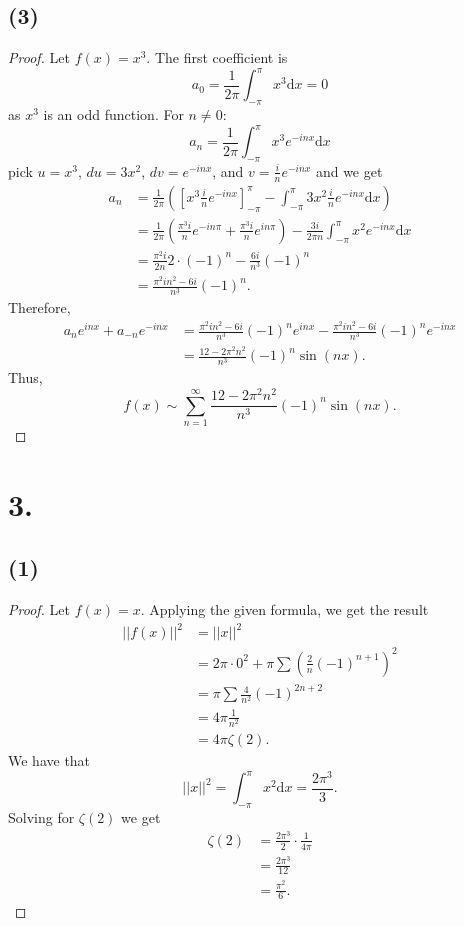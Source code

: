 \documentclass{article}
\begin{document}
\subsection*{(3)}
\begin{proof}
  Let $f(x) =x^3$. The first coefficient is
  \[
  a_0 = \frac{1}{2 \pi } \int_{-\pi}^{\pi}x^3 \mathrm{d}x = 0  
  \]
  as $x^3$ is an odd function. For $n \neq 0$:
  \[
  a_n = \frac{1}{2 \pi}\int_{-\pi}^{\pi}x^3e^{-inx}\mathrm{d}x  
  \]
  pick $u = x^3$, $du = 3x^2$, $dv = e^{-inx}$, and $v = \frac{i}{n}e^{-inx}$ and we get
  \begin{align*}
    a_n &= \frac{1}{2 \pi}\left(\left[x^3\frac{i}{n}e^{-inx} \right]_{-\pi}^{\pi} - \int_{-\pi}^{\pi}3x^2 \frac{i}{n}e^{-inx}\mathrm{d}x \right) \\
    &= \frac{1}{2 \pi}\left(\frac{\pi^3 i}{n}e^{-in \pi} + \frac{\pi^3 i}{n}e^{in \pi} \right) - \frac{3i}{2 \pi n}\int_{-\pi}^{\pi}x^2e^{-inx}\mathrm{d}x \\
    &= \frac{\pi^2i}{2n}2 \cdot (-1)^n - \frac{6 i}{n^3}(-1)^n \\
    &= \frac{\pi^2 in^2 - 6i}{n^3}(-1)^n.
  \end{align*}
  Therefore, 
  \begin{align*}
    a_ne^{inx} + a_{-n}e^{-inx} &= \frac{\pi^2 in^2 - 6i}{n^3}(-1)^ne^{inx} -\frac{\pi^2 in^2 - 6i}{n^3}(-1)^ne^{-inx} \\
    &= \frac{12 - 2 \pi^2 n^2}{n^3}(-1)^n \sin(nx).
  \end{align*}
  Thus, 
  \[
  f(x) \sim \sum\limits_{n = 1}^{\infty}\frac{12 - 2 \pi^2 n^2}{n^3}(-1)^n \sin(nx).  
  \]
\end{proof}
\section*{3.}
\subsection*{(1)}
\begin{proof}
Let $f(x) = x$. Applying the given formula, we get the result
\begin{align*}
  ||f(x)||^2 &= ||x||^2 \\
  &= 2 \pi \cdot 0^2 + \pi \sum\left(\frac{2}{n}(-1)^{n + 1} \right)^2 \\
  &= \pi \sum \frac{4}{n^2}(-1)^{2n + 2}\\
  &= 4 \pi \frac{1}{n^2}\\
  &= 4 \pi \zeta(2).
\end{align*}
We have that 
\[
 ||x||^2 = \int_{-\pi}^{\pi}x^2 \mathrm{d}x = \frac{2\pi^3}{3}. 
\]
Solving for $\zeta(2)$ we get
\begin{align*}
  \zeta(2) &= \frac{2\pi^3}{2}\cdot \frac{1}{4 \pi} \\
  &= \frac{2 \pi^3}{12} \\
  &= \frac{\pi^2}{6}.
\end{align*}
\end{proof}
\end{document}
